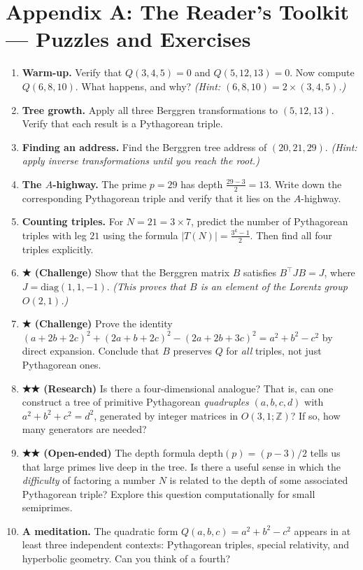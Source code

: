 \section{Appendix A: The Reader's Toolkit --- Puzzles and Exercises}
\begin{enumerate}
\def\labelenumi{\arabic{enumi}.}
\item
  \textbf{Warm-up.} Verify that \(Q(3, 4, 5) = 0\) and \(Q(5, 12, 13) = 0\). Now compute \(Q(6, 8, 10)\). What happens, and why? \emph{(Hint: \((6, 8, 10) = 2 \times (3, 4, 5)\).)}
\item
  \textbf{Tree growth.} Apply all three Berggren transformations to \((5, 12, 13)\). Verify that each result is a Pythagorean triple.
\item
  \textbf{Finding an address.} Find the Berggren tree address of \((20, 21, 29)\). \emph{(Hint: apply inverse transformations until you reach the root.)}
\item
  \textbf{The \(A\)-highway.} The prime \(p = 29\) has depth \(\frac{29 - 3}{2} = 13\). Write down the corresponding Pythagorean triple and verify that it lies on the \(A\)-highway.
\item
  \textbf{Counting triples.} For \(N = 21 = 3 \times 7\), predict the number of Pythagorean triples with leg \(21\) using the formula \(|T(N)| = \frac{3^k - 1}{2}\). Then find all four triples explicitly.
\item
  \textbf{★ (Challenge)} Show that the Berggren matrix \(B\) satisfies \(B^\top J B = J\), where \(J = \text{diag}(1, 1, -1)\). \emph{(This proves that \(B\) is an element of the Lorentz group \(O(2,1)\).)}
\item
  \textbf{★ (Challenge)} Prove the identity \((a + 2b + 2c)^2 + (2a + b + 2c)^2 - (2a + 2b + 3c)^2 = a^2 + b^2 - c^2\) by direct expansion. Conclude that \(B\) preserves \(Q\) for \emph{all} triples, not just Pythagorean ones.
\item
  \textbf{★★ (Research)} Is there a four-dimensional analogue? That is, can one construct a tree of primitive Pythagorean \emph{quadruples} \((a, b, c, d)\) with \(a^2 + b^2 + c^2 = d^2\), generated by integer matrices in \(O(3,1; \mathbb{Z})\)? If so, how many generators are needed?
\item
  \textbf{★★ (Open-ended)} The depth formula \(\text{depth}(p) = (p-3)/2\) tells us that large primes live deep in the tree. Is there a useful sense in which the \emph{difficulty} of factoring a number \(N\) is related to the depth of some associated Pythagorean triple? Explore this question computationally for small semiprimes.
\item
  \textbf{A meditation.} The quadratic form \(Q(a, b, c) = a^2 + b^2 - c^2\) appears in at least three independent contexts: Pythagorean triples, special relativity, and hyperbolic geometry. Can you think of a fourth?
\end{enumerate}
